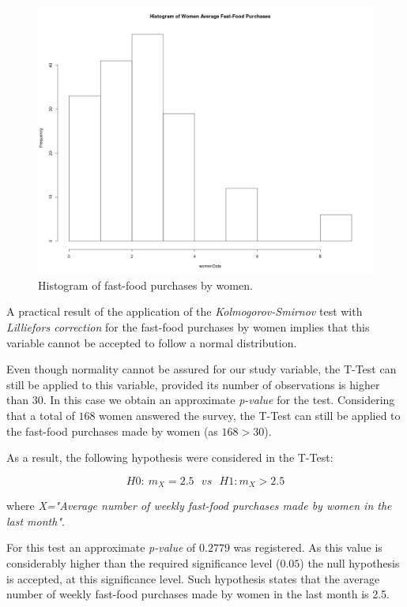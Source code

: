 \documentclass[12pt]{article}
\begin{document}
\begin{figure}[H]
	\centering
	\includegraphics[scale=0.28]{images/Histogram_WomenData.png}
	\caption{Histogram of fast-food purchases by women.}
	\label{histogram_women_purchases}
\end{figure}

A practical result of the application of the \emph{Kolmogorov-Smirnov} test with \emph{Lilliefors correction} for the fast-food purchases by women implies that this variable cannot be accepted to follow a normal distribution.

Even though normality cannot be assured for our study variable, the T-Test  can still be applied to this variable, provided its number of observations is higher than $30$. In this case we obtain an approximate \emph{p-value} for the test. Considering that a total of $168$ women answered the survey, the T-Test can still be applied to the fast-food purchases made by women (as $168 > 30$).

As a result, the following hypothesis were considered in the T-Test:

$$ H0: \: m_{X} = 2.5 \: \: \: vs \: \: \: H1: m_{X} > 2.5$$

where \emph{X="Average number of weekly fast-food purchases made by women in the last month"}.

For this test an approximate \emph{p-value} of $0.2779$ was registered. As this value is considerably higher than the required significance level ($0.05$) the null hypothesis is accepted, at this significance level. Such hypothesis states that the average number of weekly fast-food purchases made by women in the last month is 2.5.
\end{document}
